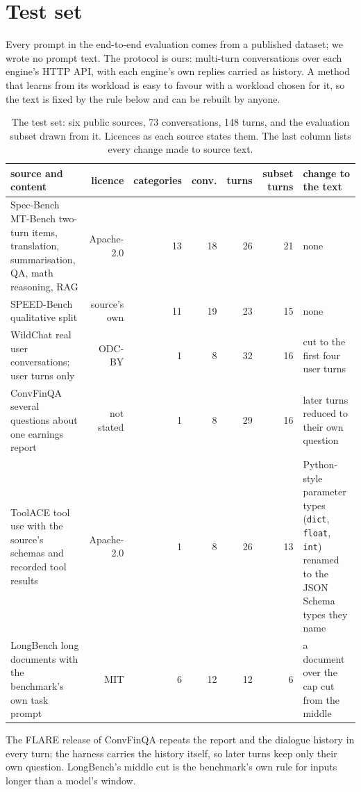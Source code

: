 \documentclass[10pt,twocolumn,letterpaper]{article}
\begin{document}
\section{Test set}\label{app:A}

Every prompt in the end-to-end evaluation comes from a published dataset; we wrote no prompt text. The protocol is ours: multi-turn conversations over each engine's HTTP API, with each engine's own replies carried as history. A method that learns from its workload is easy to favour with a workload chosen for it, so the text is fixed by the rule below and can be rebuilt by anyone.

\begin{table}[t]
\centering\small
\caption{The test set: six public sources, 73 conversations, 148 turns, and the evaluation subset drawn from it. Licences as each source states them. The last column lists every change made to source text.}
\label{tab:testset}
\setlength{\tabcolsep}{4pt}
\begin{tabularx}{\textwidth}{XrrrrrX}
\toprule
\rowcolor{head}\textbf{source and content} & \textbf{licence} & \textbf{categories} & \textbf{conv.} & \textbf{turns} & \textbf{subset turns} & \textbf{change to the text} \\
\midrule
Spec-Bench \cite{xia2024unlocking}\newline MT-Bench two-turn items, translation, summarisation, QA, math reasoning, RAG & Apache-2.0 & 13 & 18 & 26 & 21 & none \\
SPEED-Bench \cite{abramovich2026speed}\newline qualitative split & source's own & 11 & 19 & 23 & 15 & none \\
WildChat \cite{zhao2024wildchat}\newline real user conversations; user turns only & ODC-BY & 1 & 8 & 32 & 16 & cut to the first four user turns \\
ConvFinQA \cite{chen2022convfinqa,xie2023pixiu}\newline several questions about one earnings report & not stated & 1 & 8 & 29 & 16 & later turns reduced to their own question \\
ToolACE \cite{liu2025toolace}\newline tool use with the source's schemas and recorded tool results & Apache-2.0 & 1 & 8 & 26 & 13 & Python-style parameter types (\texttt{dict}, \texttt{float}, \texttt{int}) renamed to the JSON Schema types they name \\
LongBench \cite{bai2024longbench}\newline long documents with the benchmark's own task prompt & MIT & 6 & 12 & 12 & 6 & a document over the cap cut from the middle \\
\bottomrule
\end{tabularx}
\par\smallskip\parbox{\linewidth}{\footnotesize The FLARE release of ConvFinQA repeats the report and the dialogue history in every turn; the harness carries the history itself, so later turns keep only their own question. LongBench's middle cut is the benchmark's own rule for inputs longer than a model's window.}
\end{table}
\end{document}
